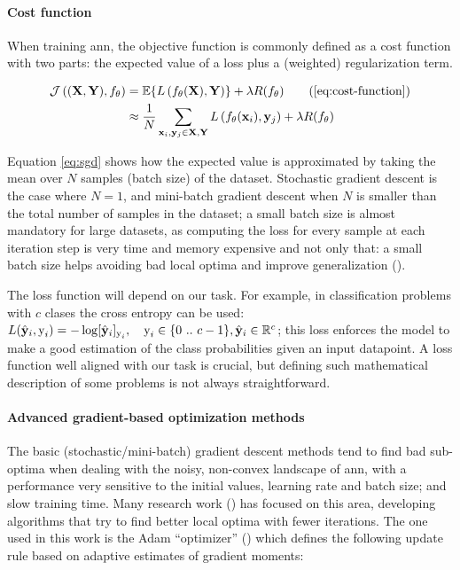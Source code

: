 \documentclass[../main.tex]{subfiles}
\begin{document}
\paragraph{Cost function} When training \gls{ann}, the objective function is
commonly defined as a cost function with two parts: the expected value of a
loss plus a (weighted) regularization term.

\begin{subequations}\label{eq:cost-function}
\begin{align}
\mathcal{J}\left( (\tensor{X}, \tensor{Y}), f_{\theta} \right) & =
\mathbb{E}\{ L \left( f_{\theta}(\tensor{X}), \tensor{Y} \right) \}
+ \lambda R(f_{\theta}) \tag{\ref{eq:cost-function}}\\
& \approx \frac{1}{N}
\sum_{\tensor{x}_i, \tensor{y}_j \in \tensor{X}, \tensor{Y}}
{L \left( f_{\theta} (\tensor{x}_i), \tensor{y}_j \right)}
+ \lambda R(f_{\theta}) \label{eq:sgd}
\end{align}
\end{subequations}

Equation \eqref{eq:sgd} shows how the expected
value is approximated by taking the mean over $N$ samples (batch size) of the
dataset.
Stochastic gradient descent is the case where $N=1$, and mini-batch
gradient descent when $N$ is smaller than the total number
of samples in the dataset; a small batch size is almost mandatory for large
datasets, as computing the loss for every sample at each iteration step is very
time and memory expensive and not only that: a small batch size helps avoiding
bad local optima and improve generalization
(\cite{DBLP:journals/corr/abs-1804-07612,Zhang2017No0}).

The loss function will depend on our task. For example, in classification
problems with $c$ clases the cross entropy can be used:
$ L(\hat{\mathbf{y}}_i, \text{y}_i) = -\log [\hat{\mathbf{y}}_i]_{\text{y}_i},
\quad \text{y}_i \in \{0\ ..\ c - 1\}, \hat{\mathbf{y}}_i \in \mathbb{R}^{c} $; this
loss enforces the model to make a good estimation of the class probabilities
given an input datapoint.
A loss function well aligned with our task is crucial, but defining such
mathematical description of some problems is not always straightforward.

\paragraph{Advanced gradient-based optimization methods}
The basic (stochastic/mini-batch) gradient descent methods tend to find bad
sub-optima when dealing with the noisy, non-convex landscape of \gls{ann},
with a performance very sensitive to the initial values, learning rate and
batch size; and slow training time.
Many research work
(\cite{Adagrad,Hinton2012RMSProp,Zeiler2012ADADELTA,Kingma2014Adam})
has focused on this area, developing algorithms that try to
find better local optima with fewer iterations. The one used in this work
is the Adam ``optimizer'' (\cite{Kingma2014Adam}) which defines the following
update rule based on adaptive estimates of gradient moments:
\end{document}

